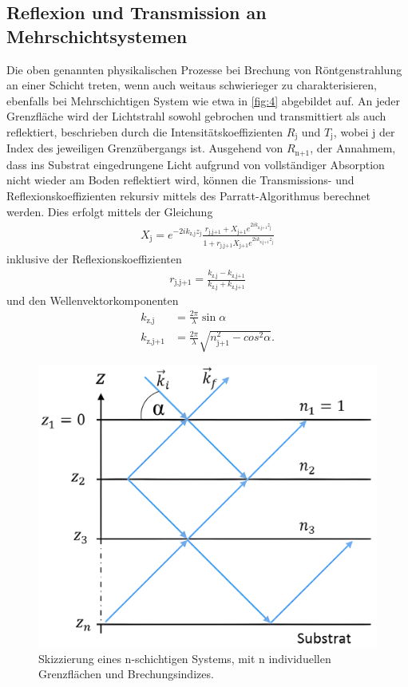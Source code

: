 \documentclass[12pt]{article}
\begin{document}
\subsection{Reflexion und Transmission an Mehrschichtsystemen}\label{subsec:multilevel}
Die oben genannten physikalischen Prozesse bei Brechung von Röntgenstrahlung an einer Schicht treten, wenn auch weitaus schwierieger zu charakterisieren, ebenfalls bei Mehrschichtigen System wie etwa in \autoref{fig:4} abgebildet auf.
An jeder Grenzfläche wird der Lichtstrahl sowohl gebrochen und transmittiert als auch reflektiert, beschrieben durch die Intensitätskoeffizienten $R_\text{j}$ und $T_\text{j}$, wobei $\text{j}$ der Index des jeweiligen Grenzübergangs ist.
Ausgehend von $R_\text{n+1}$, der Annahmem, dass ins Substrat eingedrungene Licht aufgrund von vollständiger Absorption nicht wieder am Boden reflektiert wird, können die Transmissions- und Reflexionskoeffizienten rekursiv mittels des Parratt-Algorithmus berechnet werden.\cite{parratt}
Dies erfolgt mittels der Gleichung
\begin{align}
  X_\text{j} = e^{-2ik_\text{z,j}z_\text{j}}\frac{r_\text{j,j+1}+X_\text{j+1}e^{2ik_\text{z,j+1}z_\text{j}}}{1+r_\text{j,j+1}X_\text{j+1}e^{2ik_\text{z,j+1}z_\text{j}}}
\end{align}
inklusive der Reflexionskoeffizienten
\begin{align}
  r_\text{j,j+1}=\frac{k_\text{z,j}-k_\text{z,j+1}}{k_\text{z,j}+k_\text{z,j+1}}
\end{align}
und den Wellenvektorkomponenten
\begin{align}
  k_\text{z,j}&=\frac{2\pi}{\lambda}\sin{\alpha}\\
  k_\text{z,j+1}&=\frac{2\pi}{\lambda}\sqrt{n_\text{j+1}^2-cos^2{\alpha}}\text{.}
\end{align}
\begin{figure}[H]
  \centering
  \includegraphics[scale=0.12]{Ressourcen/mehrschicht.png}
  \caption{Skizzierung eines n-schichtigen Systems, mit n individuellen\\ Grenzflächen und Brechungsindizes\cite{juwi2015}.}\label{fig:4}
\end{figure}
\end{document}
